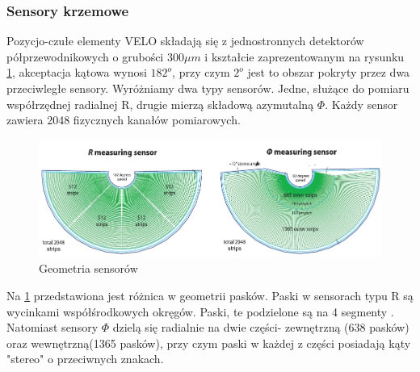 \subsubsection{Sensory krzemowe }
Pozycjo-czułe elementy VELO składają się z jednostronnych detektorów półprzewodnikowych o grubości 300$\mu m$ i  kształcie zaprezentowanym na rysunku \ref{fig:sensory}, akceptacja kątowa wynosi $182^{o}$, przy czym $2^{o}$ jest to obszar pokryty przez dwa przeciwległe sensory. Wyróżniamy dwa typy sensorów. Jedne, służące do pomiaru współrzędnej radialnej R, drugie mierzą składową azymutalną $\Phi$. Każdy sensor zawiera 2048 fizycznych kanałów pomiarowych. 
\begin{figure}[ht!]
 \centering
 \includegraphics[scale=0.6]{rozdzial2/sensory.jpeg}
 \caption{Geometria sensorów \cite{VELORaport}}
 \label{fig:sensory}
\end{figure}

Na \ref{fig:sensory} przedstawiona jest różnica w geometrii pasków. Paski w sensorach typu R są wycinkami współśrodkowych okręgów. Paski, te podzielone są na 4 segmenty . Natomiast sensory $\Phi$ dzielą się radialnie na dwie części- zewnętrzną (638 pasków) oraz wewnętrzną(1365 pasków), przy czym paski w każdej z części posiadają kąty "stereo" o przeciwnych znakach.
